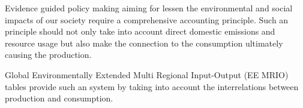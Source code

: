 Evidence guided policy making aiming for lessen the environmental and social
impacts of our society require a comprehensive accounting principle. Such an principle should not only take into account direct domestic emissions and resource usage but also make the connection to the consumption ultimately causing the production.

Global Environmentally Extended Multi Regional Input-Output (EE MRIO) tables provide such an system by taking into account the interrelations between production and consumption. 
